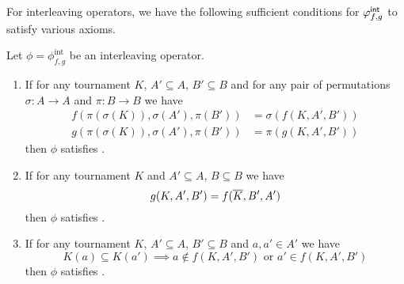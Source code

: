 For interleaving operators, we have the following sufficient conditions for
${\varphi_{f, g}^\mathsf{int}}$ to satisfy various axioms.

\begin{lemma}
   \label{tourn_result_interleaving_suffconditions}

   Let $\phi = \phi_{f,g}^{\text{int}}$ be an interleaving operator.

   \begin{enumerate}
       \item \label{tourn_item_int_lemma_anon}

        If for any tournament $K$, $A' \subseteq A$, $B' \subseteq B$ and for
        any pair of permutations $\sigma: A \to A$ and $\pi: B \to B$ we have
        \begin{align*}
            f(\pi(\sigma(K)), \sigma(A'), \pi(B')) &= \sigma(f(K, A', B')) \\
            g(\pi(\sigma(K)), \sigma(A'), \pi(B')) &= \pi(g(K, A', B'))
        \end{align*}
        then $\phi$ satisfies .

   \item \label{tourn_item_int_lemma_dual}

        If for any tournament $K$ and $A' \subseteq A$, $B \subseteq B$ we have
        \[ g(K, A', B') = f({\overline{K}}, B', A') \] then $\phi$ satisfies
        .

   \item \label{tourn_item_int_lemma_mon}

        If for any tournament $K$, $A' \subseteq A$, $B' \subseteq B$ and $a,
        a' \in A'$ we have
        \[
            K(a) \subseteq K(a')
            \implies
            a \not\in f(K, A', B') \text{ or } a' \in f(K, A', B')
        \]
        then $\phi$ satisfies .

    \end{enumerate}

\end{lemma}


